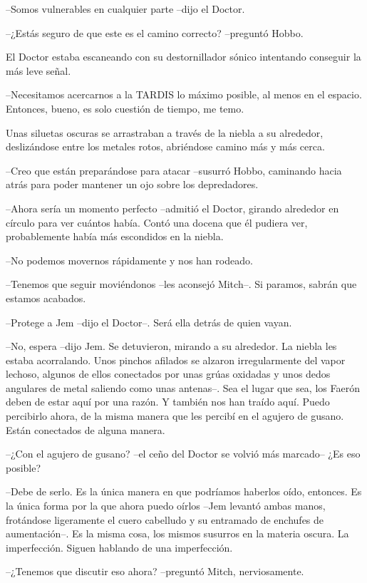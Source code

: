 {--Somos vulnerables en cualquier parte --dijo el Doctor.}

{--¿Estás seguro de que este es el camino correcto? --preguntó Hobbo.}

{El Doctor estaba escaneando con su destornillador sónico intentando
conseguir la más leve señal.}

{--Necesitamos acercarnos a la TARDIS lo máximo posible, al menos en el
espacio. Entonces, bueno, es solo cuestión de tiempo, me temo.}

{Unas siluetas oscuras se arrastraban a través de la niebla a su
 alrededor, deslizándose entre los metales rotos, abriéndose camino más y
más cerca.}

{--Creo que están preparándose para atacar --susurró Hobbo, caminando
hacia atrás para poder mantener un ojo sobre los depredadores.}

{--Ahora sería un momento perfecto --admitió el Doctor, girando alrededor
 en círculo para ver cuántos había. Contó una docena que él pudiera ver,
probablemente había más escondidos en la niebla.}

{--No podemos movernos rápidamente y nos han rodeado.}

{--Tenemos que seguir moviéndonos --les aconsejó Mitch--. Si paramos,
sabrán que estamos acabados.}

{--Protege a Jem --dijo el Doctor--. Será ella detrás de quien vayan.}

{--No, espera --dijo Jem. Se detuvieron, mirando a su alrededor. La
 niebla les estaba acorralando. Unos pinchos afilados se alzaron
 irregularmente del vapor lechoso, algunos de ellos conectados por unas
 grúas oxidadas y unos dedos angulares de metal saliendo como unas
 antenas--. Sea el lugar que sea, los Faerón deben de estar aquí por una
 razón. Y también nos han traído aquí. Puedo percibirlo ahora, de la
 misma manera que les percibí en el agujero de gusano. Están conectados
de alguna manera.}

{--¿Con el agujero de gusano? --el ceño del Doctor se volvió más
marcado-- ¿Es eso posible?}

{--Debe de serlo. Es la única manera en que podríamos haberlos oído,
 entonces. Es la única forma por la que ahora puedo oírlos --Jem levantó
 ambas manos, frotándose ligeramente el cuero cabelludo y su entramado de
 enchufes de aumentación--. Es la misma cosa, los mismos susurros en la
materia oscura. La imperfección. Siguen hablando de una imperfección.}

{--¿Tenemos que discutir eso ahora? --preguntó Mitch, nerviosamente.}

